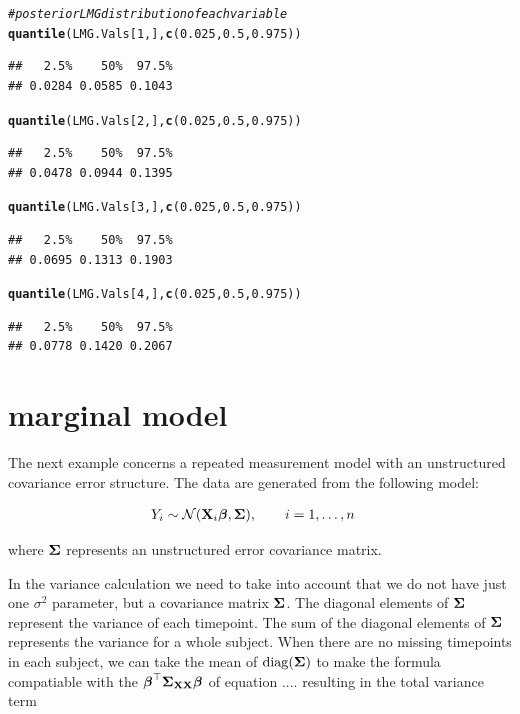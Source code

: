 \documentclass[11pt,a4paper,twoside]{book}\usepackage[]{graphicx}\usepackage[]{color}
\makeatletter
\newcommand{\hlnum}[1]{\textcolor[rgb]{0.686,0.059,0.569}{#1}}%
\newcommand{\hlcom}[1]{\textcolor[rgb]{0.678,0.584,0.686}{\textit{#1}}}%
\newcommand{\hlstd}[1]{\textcolor[rgb]{0.345,0.345,0.345}{#1}}%
\newcommand{\hlkwd}[1]{\textcolor[rgb]{0.737,0.353,0.396}{\textbf{#1}}}%
\newenvironment{kframe}{%
 \def\at@end@of@kframe{}%
 \ifinner\ifhmode%
  \def\at@end@of@kframe{\end{minipage}}%
  \begin{minipage}{\columnwidth}%
 \fi\fi%
 \def\FrameCommand##1{\hskip\@totalleftmargin \hskip-\fboxsep
 \colorbox{shadecolor}{##1}\hskip-\fboxsep
     \hskip-\linewidth \hskip-\@totalleftmargin \hskip\columnwidth}%
 \MakeFramed {\advance\hsize-\width
   \@totalleftmargin\z@ \linewidth\hsize
   \@setminipage}}%
 {\par\unskip\endMakeFramed%
 \at@end@of@kframe}
\newenvironment{knitrout}{}{} %
\makeatother
\begin{document}
\begin{knitrout}
\begin{kframe}
\begin{alltt}
\hlcom{# posterior LMG distribution of each variable}
\hlkwd{quantile}\hlstd{(LMG.Vals[}\hlnum{1}\hlstd{,],} \hlkwd{c}\hlstd{(}\hlnum{0.025}\hlstd{,} \hlnum{0.5}\hlstd{,} \hlnum{0.975}\hlstd{))}
\end{alltt}
\begin{verbatim}
##   2.5%    50%  97.5% 
## 0.0284 0.0585 0.1043
\end{verbatim}
\begin{alltt}
\hlkwd{quantile}\hlstd{(LMG.Vals[}\hlnum{2}\hlstd{,],} \hlkwd{c}\hlstd{(}\hlnum{0.025}\hlstd{,} \hlnum{0.5}\hlstd{,} \hlnum{0.975}\hlstd{))}
\end{alltt}
\begin{verbatim}
##   2.5%    50%  97.5% 
## 0.0478 0.0944 0.1395
\end{verbatim}
\begin{alltt}
\hlkwd{quantile}\hlstd{(LMG.Vals[}\hlnum{3}\hlstd{,],} \hlkwd{c}\hlstd{(}\hlnum{0.025}\hlstd{,} \hlnum{0.5}\hlstd{,} \hlnum{0.975}\hlstd{))}
\end{alltt}
\begin{verbatim}
##   2.5%    50%  97.5% 
## 0.0695 0.1313 0.1903
\end{verbatim}
\begin{alltt}
\hlkwd{quantile}\hlstd{(LMG.Vals[}\hlnum{4}\hlstd{,],} \hlkwd{c}\hlstd{(}\hlnum{0.025}\hlstd{,} \hlnum{0.5}\hlstd{,} \hlnum{0.975}\hlstd{))}
\end{alltt}
\begin{verbatim}
##   2.5%    50%  97.5% 
## 0.0778 0.1420 0.2067
\end{verbatim}
\end{kframe}
\end{knitrout}

\section{marginal  model}

The next example concerns a repeated measurement model with an unstructured covariance error structure. The data are generated from the following model:

\begin{align} 
&Y_{i} \sim \mathcal{N}({\mathbf{X}}_{i} {\boldsymbol{\beta}}, {\boldsymbol{\Sigma}}{}), \qquad i = 1, \dots, n
\end{align} 

where ${\boldsymbol{\Sigma}}{}$ represents an unstructured error covariance matrix.

In the variance calculation we need to take into account that we do not have just one $\sigma^2$ parameter, but a covariance matrix ${\boldsymbol{\Sigma}}{}$. The diagonal elements of ${\boldsymbol{\Sigma}}{}$ represent the variance of each timepoint. The sum of the diagonal elements of ${\boldsymbol{\Sigma}}{}$ represents the variance for a whole subject. When there are no missing timepoints in each subject, we can  take the mean of $\operatorname{diag}({\boldsymbol{\Sigma}}{})$ to make the formula compatiable with the ${\boldsymbol{\beta}}^\top {\boldsymbol{\Sigma}}{}_{{\mathbf{X}} {\mathbf{X}}}  {\boldsymbol{\beta}}$ of equation .... resulting in the total variance term
\end{document}
